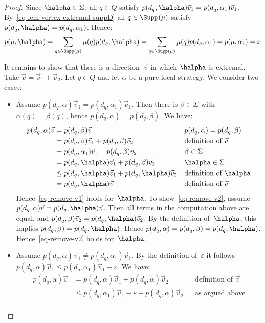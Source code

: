 \begin{proof}
Since $\halpha \in \Sigma$, all $q \in Q$ satisfy $p(d_q, \halpha) \vec{v}_1 = p(d_q, \alpha_1) \vec{v}_1$.
By~\eqref{eq-lem-vertex-extremal-suppD} all $q \in \Supp(\mu)$ satisfy $p(d_q, \halpha) = p(d_q, \alpha_1)$.
Hence:
\[
p(\mu, \halpha)
= \sum_{q \in \Supp(\mu)} \mu(q) p(d_q, \halpha)
= \sum_{q \in \Supp(\mu)} \mu(q) p(d_q, \alpha_1)
= p(\mu, \alpha_1) = x
\]

It remains to show that there is a direction~$\vec{v}$ in which $\halpha$ is extremal.
Take $\vec{v} = \vec{v}_1 + \vec{v}_2$.
Let $q \in Q$ and let $\alpha$ be a pure local strategy.
We consider two cases:
\begin{itemize}
\item
Assume $p(d_q, \alpha) \vec{v}_1 = p(d_q, \alpha_1) \vec{v}_1$.
Then there is $\beta \in \Sigma$ with $\alpha(q) = \beta(q)$, hence $p(d_q, \alpha) = p(d_q, \beta)$.
We have:
\begin{align*}
p(d_q, \alpha) \vec{v}
& = p(d_q, \beta) \vec{v} && p(d_q, \alpha) = p(d_q, \beta) \\
& = p(d_q, \beta) \vec{v}_1 + p(d_q, \beta) \vec{v}_2 && \text{definition of~$\vec{v}$} \\
& = p(d_q, \alpha_1) \vec{v}_1 + p(d_q, \beta) \vec{v}_2 && \beta \in \Sigma \\
& = p(d_q, \halpha) \vec{v}_1 + p(d_q, \beta) \vec{v}_2 && \halpha \in \Sigma \\
& \le p(d_q, \halpha) \vec{v}_1 + p(d_q, \halpha) \vec{v}_2 && \text{definition of $\halpha$} \\
& = p(d_q, \halpha) \vec{v} && \text{definition of~$\vec{v}$}
\end{align*}
Hence~\eqref{eq-remove-v1} holds for~$\halpha$.
To show~\eqref{eq-remove-v2}, assume $p(d_q, \alpha) \vec{v} = p(d_q, \halpha) \vec{v}$.
Then all terms in the computation above are equal, and $p(d_q, \beta) \vec{v}_2 = p(d_q, \halpha) \vec{v}_2$.
By the definition of~$\halpha$, this implies $p(d_q, \beta) = p(d_q, \halpha)$.
Hence $p(d_q, \alpha) = p(d_q, \beta) = p(d_q, \halpha)$.
Hence~\eqref{eq-remove-v2} holds for~$\halpha$.
\item
Assume $p(d_q, \alpha) \vec{v}_1 \ne p(d_q, \alpha_1) \vec{v}_1$.
By the definition of~$\varepsilon$ it follows $p(d_q, \alpha) \vec{v}_1 \le p(d_q, \alpha_1) \vec{v}_1 - \varepsilon$.
We have:
\begin{align*}
p(d_q, \alpha) \vec{v}
& = p(d_q, \alpha) \vec{v}_1 + p(d_q, \alpha) \vec{v}_2 && \text{definition of~$\vec{v}$} \\
& \le p(d_q, \alpha_1) \vec{v}_1 - \varepsilon + p(d_q, \alpha) \vec{v}_2 && \text{as argued above} \\

\end{align*}
\end{itemize}
\end{proof}

